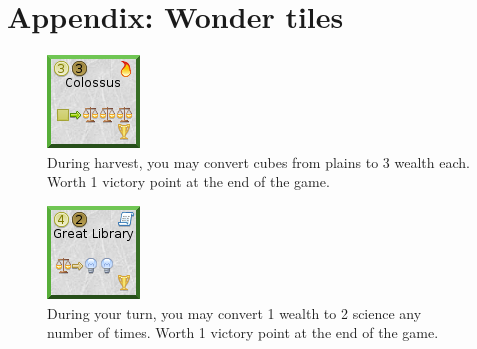 \documentclass[11pt,a4paper,titlepage]{article}
\begin{document}
\newpage
\section{Appendix: Wonder tiles}{

  \begin{figure}[!htb]
    \begin{minipage}[c]{0.1\textwidth}
      \includegraphics[scale=.7]{doe_wonder_colossus.png}
    \end{minipage}\hfill
    \begin{minipage}[c]{0.6\textwidth}
      \captionsetup{labelformat=empty, justification=justified, singlelinecheck=false}
      \caption{During harvest, you may convert cubes from plains to 3 wealth each. Worth 1 victory point at the end of the game.}
    \end{minipage}\hfill
    \label{fig:wonder_colossus}
  \end{figure}

  \begin{figure}[!htb]
    \begin{minipage}[c]{0.1\textwidth}
      \includegraphics[scale=.7]{doe_wonder_great_library.png}
    \end{minipage}\hfill
    \begin{minipage}[c]{0.6\textwidth}
      \captionsetup{labelformat=empty, justification=justified, singlelinecheck=false}
      \caption{During your turn, you may convert 1 wealth to 2 science any number of times. Worth 1 victory point at the end of the game.}
    \end{minipage}\hfill
    \label{fig:wonder_great_library}
  \end{figure}

}
\end{document}
